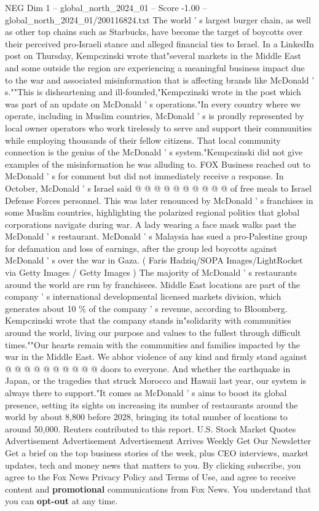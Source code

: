 \begin{textsample}{NEG Dim 1 – global\_north\_2024\_01 – Score -1.00 – global\_north\_2024\_01/200116824.txt}  \label{ex:f1_neg_289}
The world ' s largest burger chain, as well as other top chains such as Starbucks, have become the target of boycotts over their perceived pro-Israeli stance and alleged financial ties to Israel.
In a LinkedIn post on Thursday, Kempczinski wrote that"several markets in the Middle East and some outside the region are experiencing a meaningful business impact due to the war and associated misinformation that is affecting brands like McDonald ' s.""This is disheartening and ill-founded,"Kempczinski wrote in the post which was part of an update on McDonald ' s operations."In every country where we operate, including in Muslim countries, McDonald ' s is proudly represented by local owner operators who work tirelessly to serve and support their communities while employing thousands of their fellow citizens.
That local community connection is the genius of the McDonald ' s system."Kempczinski did not give examples of the misinformation he was alluding to.
FOX Business reached out to McDonald ' s for comment but did not immediately receive a response.
In October, McDonald ' s Israel said @ @ @ @ @ @ @ @ @ @ of free meals to Israel Defense Forces personnel.
This was later renounced by McDonald ' s franchises in some Muslim countries, highlighting the polarized regional politics that global corporations navigate during war.
A lady wearing a face mask walks past the McDonald ' s restaurant.
McDonald ' s Malaysia has sued a pro-Palestine group for defamation and loss of earnings, after the group led boycotts against McDonald ' s over the war in Gaza. ( Faris Hadziq/SOPA Images/LightRocket via Getty Images / Getty Images ) The majority of McDonald ' s restaurants around the world are run by franchisees.
Middle East locations are part of the company ' s international developmental licensed markets division, which generates about 10 \% of the company ' s revenue, according to Bloomberg.
Kempczinski wrote that the company stands in"solidarity with communities around the world, living our purpose and values to the fullest through difficult times.""Our hearts remain with the communities and families impacted by the war in the Middle East.
We abhor violence of any kind and firmly stand against @ @ @ @ @ @ @ @ @ @ doors to everyone.
And whether the earthquake in Japan, or the tragedies that struck Morocco and Hawaii last year, our system is always there to support."It comes as McDonald ' s aims to boost its global presence, setting its sights on increasing its number of restaurants around the world by about 8,800 before 2028, bringing its total number of locations to around 50,000.
Reuters contributed to this report.
U.S.
Stock Market Quotes Advertisement Advertisement Advertisement Arrives Weekly Get Our Newsletter Get a brief on the top business stories of the week, plus CEO interviews, market updates, tech and money news that matters to you.
By clicking subscribe, you agree to the Fox News Privacy Policy and Terms of Use, and agree to receive content and \textbf{promotional} communications from Fox News.
You understand that you can \textbf{opt-out} at any time.

\end{textsample}
